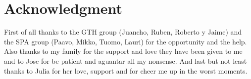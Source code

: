 \section{Acknowledgment}
First of all thanks to the GTH group (Juancho, Ruben, Roberto y Jaime) and the SPA group (Paavo, Mikko, Tuomo, Lauri) for the opportunity and the help.
Also thanks to my family for the support and love they have been given to me and to Jose for be patient and aguantar all my nonsense.
And last but not least thanks to Julia for her love, support and for cheer me up in the worst moments.